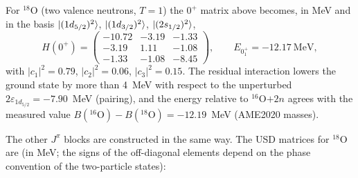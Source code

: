 \documentclass[11pt,a4paper]{article}
\begin{document}
For ${}^{18}$O (two valence neutrons, $T=1$) the $0^+$ matrix above becomes, in MeV and in the basis $\ket{(1d_{5/2})^2}$, $\ket{(1d_{3/2})^2}$, $\ket{(2s_{1/2})^2}$,
\[
H(0^+)=
\begin{pmatrix}
-10.72 & -3.19 & -1.33\\
-3.19 & 1.11 & -1.08\\
-1.33 & -1.08 & -8.45
\end{pmatrix},
\qquad E_{0^+_1}=-12.17~\text{MeV},
\]
with $|c_1|^2=0.79$, $|c_2|^2=0.06$, $|c_3|^2=0.15$. The residual interaction lowers the ground state by more than 4~MeV with respect to the unperturbed $2\varepsilon_{1d_{5/2}}=-7.90$~MeV (pairing), and the energy relative to ${}^{16}$O$+2n$ agrees with the measured value $B({}^{16}\mathrm{O})-B({}^{18}\mathrm{O})=-12.19$~MeV (AME2020 masses).

The other $J^\pi$ blocks are constructed in the same way. The USD matrices for ${}^{18}$O are (in MeV; the signs of the off-diagonal elements depend on the phase convention of the two-particle states):
\end{document}

